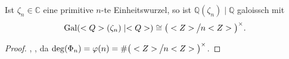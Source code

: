 \begin{conclusion}
	Ist $\zeta_n\in\mathbb C$ eine primitive $n$-te Einheitswurzel, so ist $\mathbb Q(\zeta_n) \mid \mathbb Q$ galoissch mit \begin{align*}
		\Gal(\mathbb Q(\zeta_n)\mid \mathbb Q) \cong \big(\mathbb Z\mskip-1mu\big\slash\mskip-1mu n\mathbb Z\big)^\times.
	\end{align*}
\end{conclusion}

\begin{proof}
	, , da $\deg(\Phi_n) = \phi(n) = \# \big(\mathbb Z\mskip-1mu\big\slash\mskip-1mu n\mathbb Z\big)^\times$.
\end{proof}
